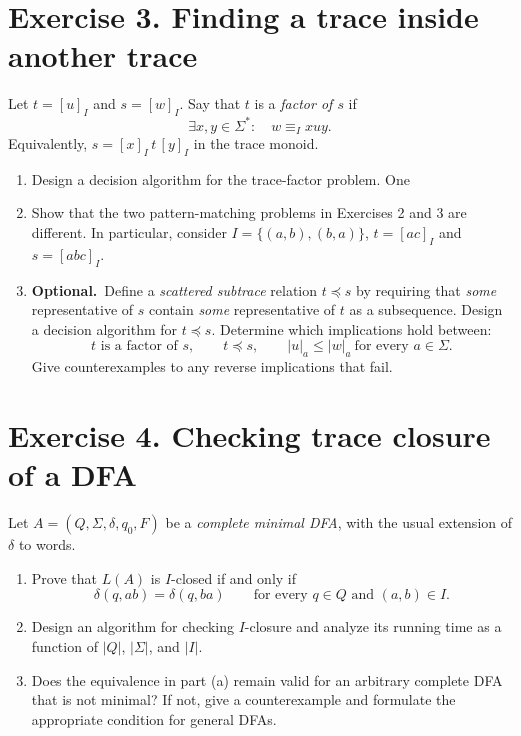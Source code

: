 \documentclass[10pt,a4paper]{article}
\newcommand{\extra}{\textbf{Optional.}\ }
\begin{document}
\section*{Exercise 3. Finding a trace inside another trace}
Let $t=[u]_I$ and $s=[w]_I$. Say that $t$ is a \emph{factor of $s$} if
\[
  \exists x,y\in\Sigma^*\colon\quad w\equiv_I xuy.
  \tag{$*$}
\]
Equivalently, $s=[x]_I\,t\,[y]_I$ in the trace monoid.
\begin{enumerate}
\item Design a decision algorithm for the trace-factor problem. One
\item Show that the two pattern-matching problems in Exercises 2 and 3
      are different. In particular, consider $I=\{(a,b),(b,a)\}$,
      $t=[ac]_I$ and $s=[abc]_I$.
\item \extra Define a \emph{scattered subtrace} relation $t\preceq s$ by
      requiring that \emph{some} representative of $s$ contain
      \emph{some} representative of $t$ as a subsequence.
      Design a decision algorithm for $t\preceq s$.
      Determine which implications hold between:
      \[
          t\text{ is a factor of }s,
          \qquad t\preceq s,
          \qquad |u|_a\le |w|_a\ \text{for every }a\in\Sigma.
      \]
      Give counterexamples to any reverse implications that fail.
\end{enumerate}

\section*{Exercise 4. Checking trace closure of a DFA}
Let $A=(Q,\Sigma,\delta,q_0,F)$ be a \emph{complete minimal DFA},
with the usual extension of $\delta$ to words.
\begin{enumerate}
\item Prove that $L(A)$ is $I$-closed if and only if
      \[
          \delta(q,ab)=\delta(q,ba)
          \qquad\text{for every }q\in Q\text{ and }(a,b)\in I.
      \]
\item Design an algorithm for checking $I$-closure and analyze its
      running time as a function of $|Q|$, $|\Sigma|$, and $|I|$.
\item Does the equivalence in part (a) remain valid for an arbitrary
      complete DFA that is not minimal? If not, give a counterexample
      and formulate the appropriate condition for general DFAs.
\end{enumerate}
\end{document}
